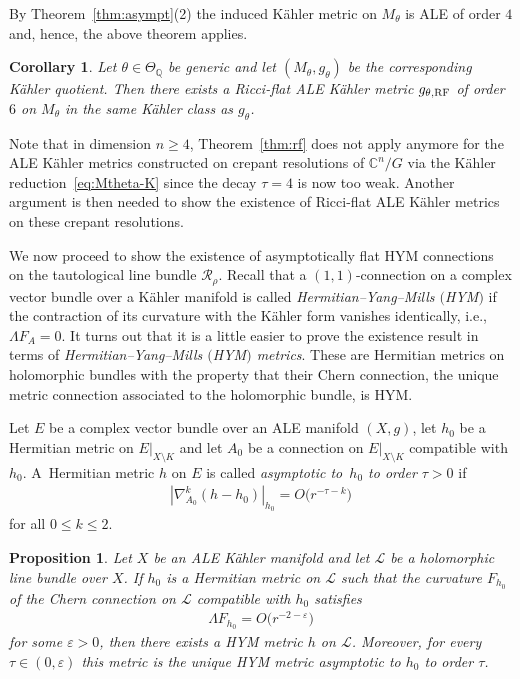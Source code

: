 \documentclass[10pt,a4paper]{amsart}
\numberwithin{equation}{section}
\newcommand{\cL}{\mathcal{L}}
\newcommand{\sR}{\mathscr{R}}
\newcommand{\Q}{{\mathbb Q}}
\newcommand{\C}{{\mathbb C}}
\renewcommand{\epsilon}{\varepsilon}
\newcommand{\eps}{\epsilon}
\newcommand{\RF}{{\rm RF}}
\newtheorem{Corollary}[Theorem]{Corollary}
\newtheorem{Proposition}[Theorem]{Proposition}
 { \theoremstyle{definition}
\newtheorem{Definition}[Theorem]{Definition}
\newtheorem{Remark}[Theorem]{Remark} }
\begin{document}
By Theorem~\ref{thm:asympt}(2) the induced K\"ahler
metric on $M_\theta$ is ALE of order $4$ and, hence, the above theorem
applies.

\begin{Corollary}
  Let $\theta \in \Theta_{\Q}$ be generic and let
  $(M_{\theta},g_{\theta})$ be the corresponding K\"ahler quotient. Then
  there exists a Ricci-flat ALE K\"ahler metric $g_{\theta, \RF}$ of
  order $6$ on $M_\theta$ in the same K\"ahler class as $g_\theta$.
\end{Corollary}

\begin{Remark}
  Note that in dimension $n\geq 4$, Theorem~\ref{thm:rf} does not
  apply anymore for the ALE K\"ahler metrics constructed on crepant
  resolutions of $\C^n/G$ via the K\"ahler reduction~\eqref{eq:Mtheta-K}
  since the decay $\tau=4$ is now too weak. Another argument is then needed to show
  the existence of Ricci-f\/lat ALE K\"ahler metrics on these crepant
  resolutions.
\end{Remark}

We now proceed to show the existence of asymptotically f\/lat HYM
connections on the tautological line bundle $\sR_\rho$.  Recall that a
$(1,1)$-connection on a complex vector bundle over a K\"ahler manifold
is called {\em Hermitian--Yang--Mills $($HYM$)$} if the contraction of its
curvature with the K\"ahler form vanishes identically, i.e., $\Lambda F_A
=0$. It turns out that it is a little easier to prove the existence
result in terms of {\em Hermitian--Yang--Mills $($HYM$)$ metrics}. These
are Hermitian metrics on holomorphic bundles with the property that
their Chern connection, the unique metric connection associated to
the holomorphic bundle, is HYM.

\begin{Definition}\label{def:afm}
  Let $E$ be a complex vector bundle over an ALE manifold $(X,g)$, let
  $h_0$ be a Hermitian metric on $E|_{X{\setminus} K}$ and let $A_0$ be
  a connection on $E|_{X{\setminus} K}$ compatible with $h_0$.  A~Hermitian metric $h$ on $E$ is called \emph{asymptotic to~$h_0$ to
    order $\tau >0$} if
  \begin{gather*}
    |\nabla_{A_0}^k (h-h_0)|_{h_0} = O\big(r^{-\tau-k}\big)
  \end{gather*}
  for all $0 \leq k \leq 2$.
\end{Definition}

\begin{Proposition}\label{prop:hym}
  Let $X$ be an ALE K\"ahler manifold and let $\cL$ be a holomorphic
  line bundle over $X$.  If $h_0$ is a Hermitian metric on $\cL$ such
  that the curvature $F_{h_0}$ of the Chern connection on $\cL$
  compatible with $h_0$ satisfies
  \begin{gather*}
    \Lambda F_{h_0} = O\big(r^{-2-\eps}\big)
  \end{gather*}
  for some $\eps>0$, then there exists a HYM metric $h$ on $\cL$.
  Moreover, for every $\tau \in (0, \epsilon)$ this metric is the
  unique HYM metric asymptotic to $h_0$ to order $\tau$.
\end{Proposition}
\end{document}
